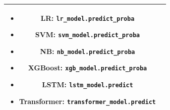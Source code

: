 \begin{table}[H]
\begin{tabularx}{\textwidth}{|c|X|}
              \begin{itemize}[noitemsep, topsep=0pt]
                  \item LR: \texttt{lr\_model.predict\_proba}
                  \item SVM: \texttt{svm\_model.predict\_proba}
                  \item NB: \texttt{nb\_model.predict\_proba}
                  \item XGBoost: \texttt{xgb\_model.predict\_proba}
                  \item LSTM: \texttt{lstm\_model.predict}
                  \item Transformer: \texttt{transformer\_model.predict}
              \end{itemize} \\
        \hline
    \end{tabularx}
\end{table}

